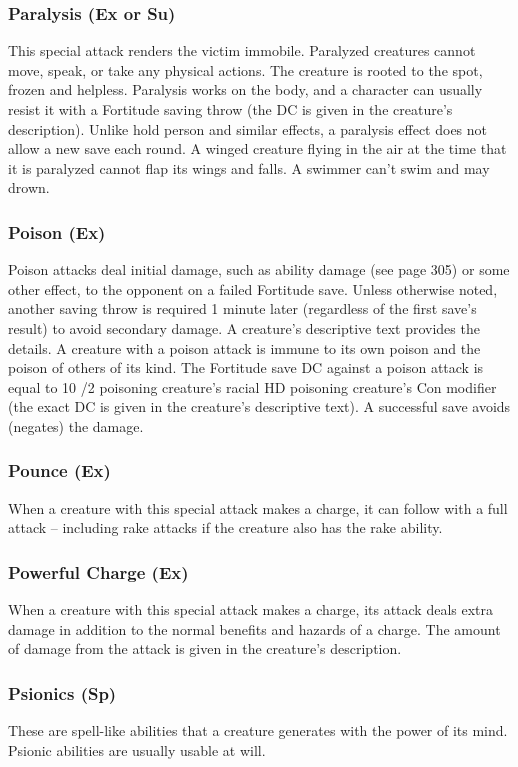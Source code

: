 {\subsubsection{Paralysis (Ex or Su)} This special attack renders the victim immobile. Paralyzed creatures cannot move, speak, or take any physical actions. The creature is rooted to the spot, frozen and helpless. Paralysis works on the body, and a character can usually resist it with a Fortitude saving throw (the DC is given in the creature's description). Unlike hold person and similar effects, a paralysis effect does not allow a new save each round. A winged creature flying in the air at the time that it is paralyzed cannot flap its wings and falls. A swimmer can't swim and may drown. 

\subsubsection{Poison (Ex)} Poison attacks deal initial damage, such as ability damage (see page 305) or some other effect, to the opponent on a failed Fortitude save. Unless otherwise noted, another saving throw is required 1 minute later (regardless of the first save's result) to avoid secondary damage. A creature's descriptive text provides the details.
A creature with a poison attack is immune to its own poison and the poison of others of its kind.
The Fortitude save DC against a poison attack is equal to 10 /2 poisoning creature's racial HD \add poisoning creature's Con modifier (the exact DC is given in the creature's descriptive text).
A successful save avoids (negates) the damage.

\subsubsection{Pounce (Ex)} When a creature with this special attack makes a charge, it can follow with a full attack -- including rake attacks if the creature also has the rake ability.

\subsubsection{Powerful Charge (Ex)} When a creature with this special attack makes a charge, its attack deals extra damage in addition to the normal benefits and hazards of a charge. The amount of damage from the attack is given in the creature's description.

\subsubsection{Psionics (Sp)} These are spell-like abilities that a creature generates with the power of its mind. Psionic abilities are usually usable at will.

}
